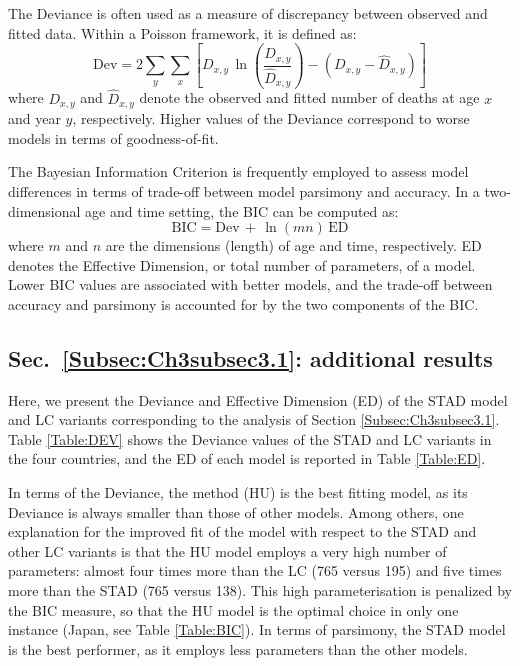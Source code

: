 \documentclass[Thesis]{subfiles}
\begin{document}
The Deviance is often used as a measure of discrepancy between observed and fitted data. Within a Poisson framework, it is defined as:   
%
\begin{equation}
\mathrm{Dev}= 2 \sum_{y} \sum_{x} \left[D_{x,y} \, \ln \left( \frac{D_{x,y}}{\hat{D}_{x,y}}  \right) - (D_{x,y} - \hat{D}_{x,y} )\right] 
\end{equation}
%
where $D_{x,y}$ and $\hat{D}_{x,y}$ denote the observed and fitted
number of deaths at age $x$ and year $y$, respectively. Higher values
of the Deviance correspond to worse models in terms of goodness-of-fit. 

The Bayesian Information Criterion \citep[BIC,][]{schwarz1978estimating} is frequently employed to assess model differences in terms of trade-off between model parsimony and accuracy. In a two-dimensional age and time setting, the BIC can be computed as: 
%
\begin{equation}
\mathrm{BIC}=\mathrm{Dev} \, +  \, \ln(m n)  \, \mathrm{ED}
\end{equation}
%
where $m$ and $n$ are the dimensions (length) of age and time,
respectively. ED denotes the Effective Dimension, or total number
of parameters, of a model. Lower BIC values are associated with better
models, and the trade-off between accuracy and parsimony is accounted
for by the two components of the BIC. 


\subsection{Sec.~\ref{Subsec:Ch3subsec3.1}: additional results}\label{Subsec:Ch3appB}

Here, we present the Deviance and Effective Dimension (ED) of the STAD model and LC variants corresponding to the analysis of Section \ref{Subsec:Ch3subsec3.1}. Table \ref{Table:DEV} shows the Deviance values of the STAD and LC variants in the four countries, and the ED of each model is reported in Table \ref{Table:ED}. 

In terms of the Deviance, the \citeauthor{hyndman2007robust} method (HU) is the best fitting model, as its Deviance is always smaller than those of other models. Among others, one explanation for the improved fit of the model with respect to the STAD and other LC variants is that the HU model employs a very high number of parameters: almost four times more than the LC (765 versus 195) and five times more than the STAD (765 versus 138). This high parameterisation is penalized by the BIC measure, so that the HU model is the optimal choice in only one instance (Japan, see Table \ref{Table:BIC}). In terms of parsimony, the STAD model is the best performer, as it employs less parameters than the other models.
\end{document}
